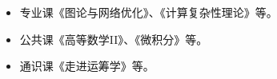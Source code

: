 %
%


\begin{itemize}[leftmargin=*]
	\item 专业课《图论与网络优化》、《计算复杂性理论》等。
	\item 公共课《高等数学II》、《微积分》等。
	\item 通识课《走进运筹学》等。
\end{itemize}